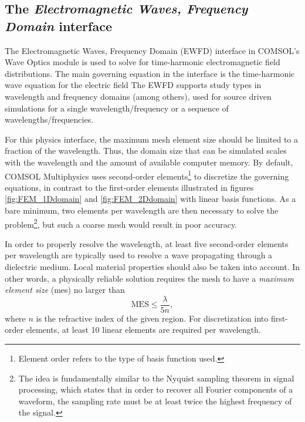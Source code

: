 \subsection{The \emph{Electromagnetic Waves, Frequency Domain} interface}
The Electromagnetic Waves, Frequency Domain (EWFD) interface in COMSOL's Wave Optics module is used to solve for time-harmonic electromagnetic field distributions. The main governing equation in the interface is the time-harmonic wave equation for the electric field  The EWFD supports study types in wavelength and frequency domains (among others\cite{comsol_waveopticsmodule}), used for source driven simulations for a single wavelength/frequency or a sequence of wavelengths/frequencies.

For this physics interface, the maximum mesh element size should be limited to a fraction of the wavelength. Thus, the domain size that can be simulated scales with the wavelength and the amount of available computer memory. By default, COMSOL Multiphysics uses second-order elements\footnote{Element order refers to the type of basis function used.} to discretize the governing equations\cite{comsol_ElementOrder}, in contrast to the first-order elements illustrated in figures \ref{fig:FEM_1Ddomain} and \ref{fig:FEM_2Ddomain} with linear basis functions. As a bare minimum, two elements per wavelength are then necessary to solve the problem\footnote{The idea is fundamentally similar to the Nyquist sampling theorem in signal processing, which states that in order to recover all Fourier components of a waveform, the sampling rate must be at least twice the highest frequency of the signal.}, but such a coarse mesh would result in poor accuracy. 

In order to properly resolve the wavelength, at least five second-order elements per wavelength are typically used to resolve a wave propagating through a dielectric medium\cite{comsol_simulationToolsEM}. Local material properties should also be taken into account. In other words, a physically reliable solution requires the mesh to have a \emph{maximum element size} (\ac{mes}) no larger than
\begin{equation}
    \text{MES} \leq \frac{\lambda}{5n},
    \label{eq:MES<=lambda/5n}
\end{equation}
where $n$ is the refractive index of the given region. For discretization into first-order elements, at least 10 linear elements are required per wavelength\cite{comsol_waveopticsmodule}.

